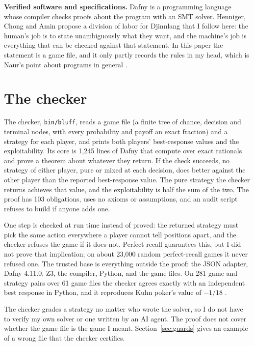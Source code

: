 \documentclass[11pt]{article}
\newcommand{\code}[1]{\texttt{\small #1}}
\begin{document}
\textbf{Verified software and specifications.} Dafny \cite{leino2010} is a programming language
whose compiler checks proofs about the program with an SMT solver. Henniger, Chong and Amin
propose a division of labor for Djinnlang \cite{henniger2026} that I follow here: the human's job
is to state unambiguously what they want, and the machine's job is everything that can be checked
against that statement. In this paper the statement is a game file, and it only partly records the rules in my head, which
is Naur's point about programs in general \cite{naur1985}.

\section{The checker}\label{sec:checker}

The checker, \code{bin/bluff}, reads a game file (a finite tree of chance, decision and terminal
nodes, with every probability and payoff an exact fraction) and a strategy for each player, and
prints both players' best-response values and the exploitability. Its core is 1,245 lines of Dafny
that compute over exact rationals and prove a theorem about whatever they return. If the check
succeeds, no strategy of either player, pure or mixed at each decision, does better against
the other player than the reported best-response value. The pure strategy the checker returns
achieves that value, and the exploitability is half the sum of the two. The proof has 103
obligations, uses no axioms or assumptions, and an audit script refuses to build if anyone adds
one.

One step is checked at run time instead of proved: the returned strategy must pick the same action
everywhere a player cannot tell positions apart, and the checker refuses the game if it does not.
Perfect recall guarantees this, but I did not prove that implication; on about 23,000 random
perfect-recall games it never refused one. The trusted base is everything outside the proof: the
JSON adapter, Dafny 4.11.0, Z3, the compiler, Python, and the game files. On 281 game and strategy
pairs over 61 game files the checker agrees exactly with an independent best response in Python,
and it reproduces Kuhn poker's value of $-1/18$ \cite{kuhn1950}.

The checker grades a strategy no matter who wrote the solver, so I do not have to verify my
own solver or one written by an AI agent. The proof does not cover whether
the game file is the game I meant. Section~\ref{sec:guards} gives an example of a wrong file that the checker certifies.
\end{document}
